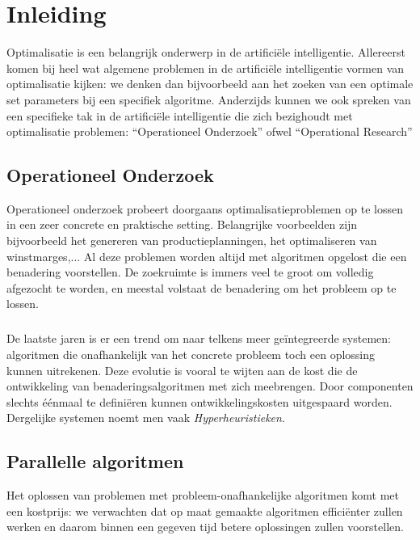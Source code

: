 \chapter{Inleiding}

Optimalisatie is een belangrijk onderwerp in de artifici\"ele intelligentie. Allereerst komen bij heel wat algemene problemen in de artifici\"ele intelligentie vormen van optimalisatie kijken: we denken dan bijvoorbeeld aan het zoeken van een optimale set parameters bij een specifiek algoritme. Anderzijds kunnen we ook spreken van een specifieke tak in de artifici\"ele intelligentie die zich bezighoudt met optimalisatie problemen: ``Operationeel Onderzoek'' ofwel ``Operational Research''

\section{Operationeel Onderzoek}

Operationeel onderzoek probeert doorgaans optimalisatieproblemen op te lossen in een zeer concrete en praktische setting. Belangrijke voorbeelden zijn bijvoorbeeld het genereren van productieplanningen, het optimaliseren van winstmarges,... Al deze problemen worden altijd met algoritmen opgelost die een benadering voorstellen. De zoekruimte is immers veel te groot om volledig afgezocht te worden, en meestal volstaat de benadering om het probleem op te lossen.

\paragraph{}
De laatste jaren is er een trend om naar telkens meer ge\"integreerde systemen: algoritmen die onafhankelijk van het concrete probleem toch een oplossing kunnen uitrekenen. Deze evolutie is vooral te wijten aan de kost die de ontwikkeling van benaderingsalgoritmen met zich meebrengen. Door componenten slechts \'e\'enmaal te defini\"eren kunnen ontwikkelingskosten uitgespaard worden. Dergelijke systemen noemt men vaak \emph{Hyperheuristieken}.

\section{Parallelle algoritmen}

Het oplossen van problemen met probleem-onafhankelijke algoritmen komt met een kostprijs: we verwachten dat op maat gemaakte algoritmen effici\"enter zullen werken en daarom binnen een gegeven tijd betere oplossingen zullen voorstellen.

